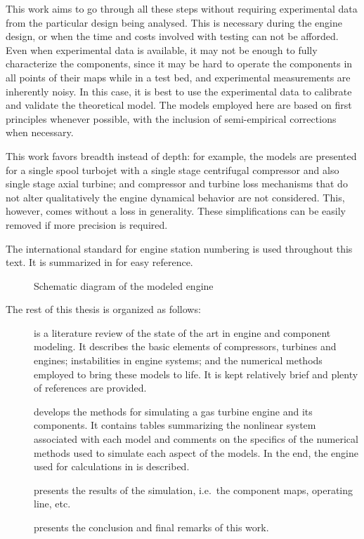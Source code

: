 This work aims to go through all these steps without requiring experimental data from the particular design being analysed.
This is necessary during the engine design, or when the time and costs involved with testing can not be afforded.
Even when experimental data is available, it may not be enough to fully characterize the components,
since it may be hard to operate the components in all points of their maps while in a test bed,
and experimental measurements are inherently noisy. 
In this case, it is best to use the experimental data to calibrate and validate the theoretical model.
The models employed here are based on first principles whenever possible, 
with the inclusion of semi-empirical corrections when necessary. 

This work favors breadth instead of depth: 
for example, the models are presented for a single spool turbojet with a single stage centrifugal compressor and also single stage axial turbine; and compressor and turbine loss mechanisms that do not alter qualitatively the engine dynamical behavior are not considered. 
This, however, comes without a loss in generality. 
These simplifications can be easily removed if more precision is required.

The international standard for engine station numbering \cite{ARP755A} is used throughout this text. 
It is summarized in  for easy reference.

\begin{figure}[b]
    \caption{Schematic diagram of the modeled engine}
    \label{fig:engine_schematic}
    
    \source{\authorsfigure}
\end{figure}


The rest of this thesis is organized as follows: 
\begin{description}
    \item[] is a literature review of the state of the art in engine and component modeling. 
        It describes the basic elements of compressors, turbines and engines; 
        instabilities in engine systems; and the numerical methods employed to bring these models to life. 
        It is kept relatively brief and plenty of references are provided.
    \item[] develops the methods for simulating a gas turbine engine and its components. 
        It contains tables summarizing the nonlinear system associated with each model 
        and comments on the specifics of the numerical methods used to simulate each aspect of the models. 
        In the end, the engine used for calculations in  is described.
    \item[] presents the results of the simulation, i.e.\ the component maps, operating line, etc.
    \item[] presents the conclusion and final remarks of this work.
\end{description}

